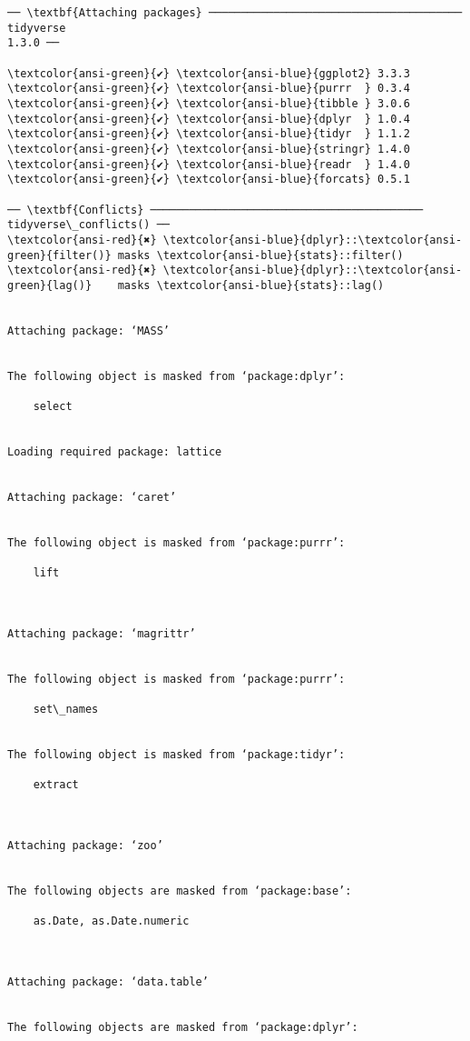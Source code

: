 \documentclass[11pt]{article}
\begin{document}
    \begin{Verbatim}[commandchars=\\\{\}]
── \textbf{Attaching packages} ─────────────────────────────────────── tidyverse
1.3.0 ──

\textcolor{ansi-green}{✔} \textcolor{ansi-blue}{ggplot2} 3.3.3     \textcolor{ansi-green}{✔} \textcolor{ansi-blue}{purrr  } 0.3.4
\textcolor{ansi-green}{✔} \textcolor{ansi-blue}{tibble } 3.0.6     \textcolor{ansi-green}{✔} \textcolor{ansi-blue}{dplyr  } 1.0.4
\textcolor{ansi-green}{✔} \textcolor{ansi-blue}{tidyr  } 1.1.2     \textcolor{ansi-green}{✔} \textcolor{ansi-blue}{stringr} 1.4.0
\textcolor{ansi-green}{✔} \textcolor{ansi-blue}{readr  } 1.4.0     \textcolor{ansi-green}{✔} \textcolor{ansi-blue}{forcats} 0.5.1

── \textbf{Conflicts} ──────────────────────────────────────────
tidyverse\_conflicts() ──
\textcolor{ansi-red}{✖} \textcolor{ansi-blue}{dplyr}::\textcolor{ansi-green}{filter()} masks \textcolor{ansi-blue}{stats}::filter()
\textcolor{ansi-red}{✖} \textcolor{ansi-blue}{dplyr}::\textcolor{ansi-green}{lag()}    masks \textcolor{ansi-blue}{stats}::lag()


Attaching package: ‘MASS’


The following object is masked from ‘package:dplyr’:

    select


Loading required package: lattice


Attaching package: ‘caret’


The following object is masked from ‘package:purrr’:

    lift



Attaching package: ‘magrittr’


The following object is masked from ‘package:purrr’:

    set\_names


The following object is masked from ‘package:tidyr’:

    extract



Attaching package: ‘zoo’


The following objects are masked from ‘package:base’:

    as.Date, as.Date.numeric



Attaching package: ‘data.table’


The following objects are masked from ‘package:dplyr’:


\end{Verbatim}
\end{document}
